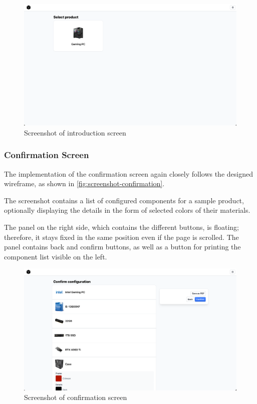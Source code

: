 \begin{figure}[h]
\centering
\includegraphics[width=\textwidth]{images/screenshot_introduction.png}
\caption{Screenshot of introduction screen}
\label{fig:screenshot-introduction}
\end{figure}

\subsubsection{Confirmation Screen}

The implementation of the confirmation screen again closely follows the designed wireframe, as shown in \autoref{fig:screenshot-confirmation}.

The screenshot contains a list of configured components for a sample product, optionally displaying the details in the form of selected colors of their materials.

The panel on the right side, which contains the different buttons, is floating; therefore, it stays fixed in the same position even if the page is scrolled. The panel contains back and confirm buttons, as well as a button for printing the component list visible on the left.

\begin{figure}[h]
\centering
\includegraphics[width=\textwidth]{images/screenshot_confirmation.png}
\caption{Screenshot of confirmation screen}
\label{fig:screenshot-confirmation}
\end{figure}


